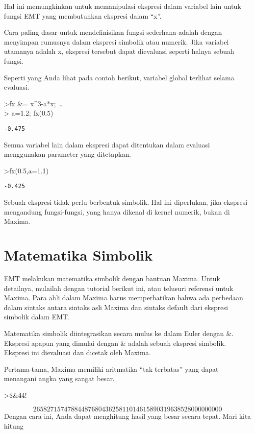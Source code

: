 \documentclass[
]{book}
\begin{document}
Hal ini memungkinkan untuk memanipulasi ekspresi dalam variabel lain untuk fungsi EMT yang membutuhkan ekspresi dalam ``x''.

Cara paling dasar untuk mendefinisikan fungsi sederhana adalah dengan menyimpan rumusnya dalam ekspresi simbolik atau numerik. Jika variabel utamanya adalah x, ekspresi tersebut dapat dievaluasi seperti halnya sebuah fungsi.

Seperti yang Anda lihat pada contoh berikut, variabel global terlihat selama evaluasi.

\textgreater fx \&= x\^{}3-a*x; \ldots{}\\
\textgreater{} a=1.2; fx(0.5)

\begin{verbatim}
-0.475
\end{verbatim}

Semua variabel lain dalam ekspresi dapat ditentukan dalam evaluasi menggunakan parameter yang ditetapkan.

\textgreater fx(0.5,a=1.1)

\begin{verbatim}
-0.425
\end{verbatim}

Sebuah ekspresi tidak perlu berbentuk simbolik. Hal ini diperlukan, jika ekspresi mengandung fungsi-fungsi, yang hanya dikenal di kernel numerik, bukan di Maxima.

\chapter{Matematika Simbolik}\label{matematika-simbolik}

EMT melakukan matematika simbolik dengan bantuan Maxima. Untuk detailnya, mulailah dengan tutorial berikut ini, atau telusuri referensi untuk Maxima. Para ahli dalam Maxima harus memperhatikan bahwa ada perbedaan dalam sintaks antara sintaks asli Maxima dan sintaks default dari ekspresi simbolik dalam EMT.

Matematika simbolik diintegrasikan secara mulus ke dalam Euler dengan \&. Ekspresi apapun yang dimulai dengan \& adalah sebuah ekspresi simbolik. Ekspresi ini dievaluasi dan dicetak oleh Maxima.

Pertama-tama, Maxima memiliki aritmatika ``tak terbatas'' yang dapat menangani angka yang sangat besar.

\textgreater\$\&44!

\[2658271574788448768043625811014615890319638528000000000\]Dengan cara ini, Anda dapat menghitung hasil yang besar secara tepat. Mari kita hitung
\end{document}
